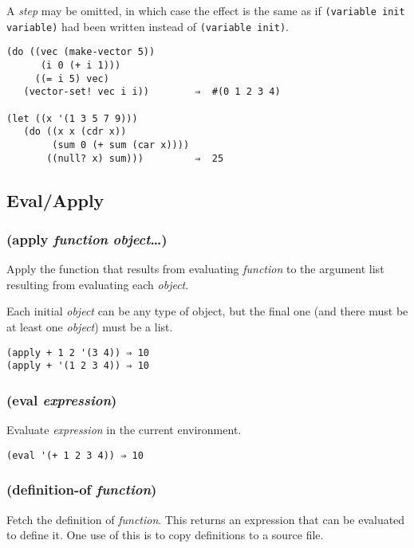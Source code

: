 \documentclass{article}
\begin{document}
A \emph{step} may be omitted, in which case the effect is the same as if
\verb|(variable init variable)| had been written instead of \verb|(variable init)|.

\begin{verbatim}
(do ((vec (make-vector 5))
      (i 0 (+ i 1)))
     ((= i 5) vec)
   (vector-set! vec i i))        ⇒  #(0 1 2 3 4)

(let ((x '(1 3 5 7 9)))
   (do ((x x (cdr x))
        (sum 0 (+ sum (car x))))
       ((null? x) sum)))         ⇒  25
\end{verbatim}

\subsection{Eval/Apply}\label{sec:evalapply}

\subsubsection{(apply \emph{function} \emph{object}\ldots{})}

Apply the function that results from evaluating \emph{function} to the argument list resulting
from evaluating each \emph{object}.

Each initial \emph{object} can be any type of object, but the final one (and there must be at
least one \emph{object}) must be a list.

\begin{verbatim}
(apply + 1 2 '(3 4)) ⇒ 10
(apply + '(1 2 3 4)) ⇒ 10
\end{verbatim}

\subsubsection{(eval \emph{expression})}

Evaluate \emph{expression} in the current environment.

\begin{verbatim}(eval '(+ 1 2 3 4)) ⇒ 10
\end{verbatim}

\subsubsection{(definition-of \emph{function})}

Fetch the definition of \emph{function}. This returns an expression that can be evaluated to
define it. One use of this is to copy definitions to a source file.
\end{document}
